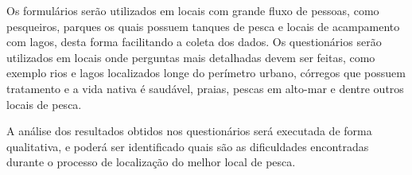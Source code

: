 Os formulários serão utilizados em locais com grande fluxo de pessoas, como pesqueiros, parques os quais possuem tanques de pesca e locais de acampamento com lagos, desta forma facilitando a coleta dos dados. Os questionários serão utilizados em locais onde perguntas mais detalhadas devem ser feitas, como exemplo rios e lagos localizados longe do perímetro urbano, córregos que possuem tratamento e a vida nativa é saudável, praias, pescas em alto-mar e dentre outros locais de pesca.

A análise dos resultados obtidos nos questionários será executada de forma qualitativa, e poderá ser identificado quais são as dificuldades encontradas durante o processo de localização do melhor local de pesca.
